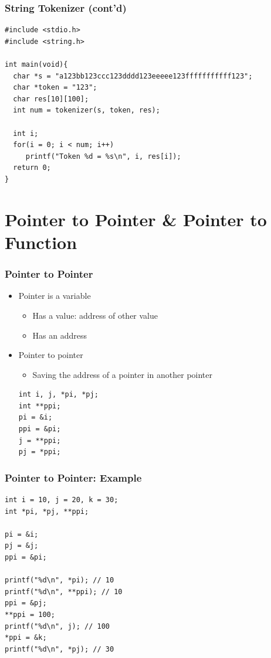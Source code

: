 \documentclass{../c-lecture}
\begin{document}
\begin{frame}[fragile]
  \frametitle{String Tokenizer (cont'd)}
  \scriptsize
  \begin{verbatim}
#include <stdio.h>
#include <string.h>

int main(void){
  char *s = "a123bb123ccc123dddd123eeeee123fffffffffff123";
  char *token = "123";
  char res[10][100];
  int num = tokenizer(s, token, res);

  int i;
  for(i = 0; i < num; i++)
     printf("Token %d = %s\n", i, res[i]);
  return 0;
}
  \end{verbatim}
\end{frame}

\section{Pointer to Pointer \& Pointer to Function}

\begin{frame}[fragile]
  \frametitle{Pointer to Pointer}
  \begin{itemize}
    \item Pointer is a variable
    \begin{itemize}
      \item Has a value: address of other value
      \item Has an address
    \end{itemize}
    \item Pointer to pointer
    \begin{itemize}
      \item Saving the address of a pointer in another pointer
    \end{itemize}
    \begin{verbatim}
int i, j, *pi, *pj;
int **ppi;
pi = &i;
ppi = &pi;
j = **ppi;
pj = *ppi;
    \end{verbatim}
  \end{itemize}
\end{frame}

\begin{frame}[fragile]
  \frametitle{Pointer to Pointer: Example}
  \begin{verbatim}
int i = 10, j = 20, k = 30;
int *pi, *pj, **ppi;

pi = &i;
pj = &j;
ppi = &pi;

printf("%d\n", *pi); // 10
printf("%d\n", **ppi); // 10
ppi = &pj;
**ppi = 100;
printf("%d\n", j); // 100
*ppi = &k;
printf("%d\n", *pj); // 30
  \end{verbatim}
\end{frame}
\end{document}
